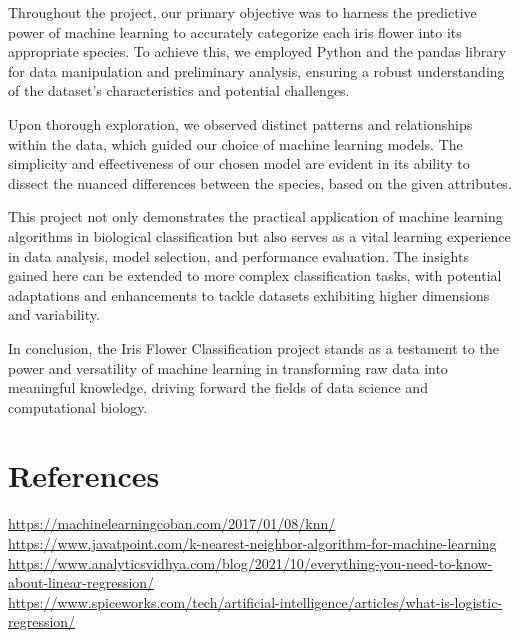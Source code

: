 \documentclass[a4paper]{article}
\begin{document}
Throughout the project, our primary objective was to harness the predictive power of machine learning to accurately categorize each iris flower into its appropriate species. To achieve this, we employed Python and the pandas library for data manipulation and preliminary analysis, ensuring a robust understanding of the dataset's characteristics and potential challenges.

Upon thorough exploration, we observed distinct patterns and relationships within the data, which guided our choice of machine learning models. The simplicity and effectiveness of our chosen model are evident in its ability to dissect the nuanced differences between the species, based on the given attributes.

This project not only demonstrates the practical application of machine learning algorithms in biological classification but also serves as a vital learning experience in data analysis, model selection, and performance evaluation. The insights gained here can be extended to more complex classification tasks, with potential adaptations and enhancements to tackle datasets exhibiting higher dimensions and variability.

In conclusion, the Iris Flower Classification project stands as a testament to the power and versatility of machine learning in transforming raw data into meaningful knowledge, driving forward the fields of data science and computational biology.

\section{References}
\href{https://machinelearningcoban.com/2017/01/08/knn/}{https://machinelearningcoban.com/2017/01/08/knn/}\\
\href{https://www.javatpoint.com/k-nearest-neighbor-algorithm-for-machine-learning}{https://www.javatpoint.com/k-nearest-neighbor-algorithm-for-machine-learning}\\
\href{https://www.analyticsvidhya.com/blog/2021/10/everything-you-need-to-know-about-linear-regression/}{https://www.analyticsvidhya.com/blog/2021/10/everything-you-need-to-know-about-linear-regression/}\\
\href{https://www.spiceworks.com/tech/artificial-intelligence/articles/what-is-logistic-regression/}{https://www.spiceworks.com/tech/artificial-intelligence/articles/what-is-logistic-regression/}
\end{document}
